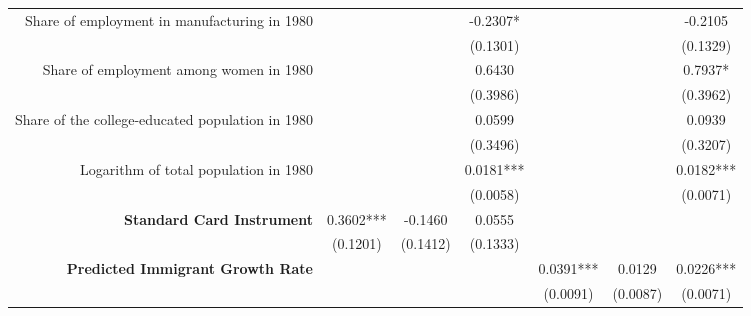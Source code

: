 \begin{frame}
\begin{table}[ht]
{\begin{tabular}{rcccccc}
                Share of employment in manufacturing in 1980                  &                 &                 & -0.2307*        &                &                 & -0.2105         \\
                                                                              &                 &                 & \small(0.1301)  &                &                 & \small(0.1329)  \\
                Share of employment among women in 1980                       &                 &                 & 0.6430          &                &                 & 0.7937*         \\
                                                                              &                 &                 & \small(0.3986)  &                &                 & \small(0.3962)  \\
                Share of the college-educated population in 1980              &                 &                 & 0.0599          &                &                 & 0.0939          \\
                                                                              &                 &                 & \small(0.3496)  &                &                 & \small(0.3207)  \\
                Logarithm of total population in 1980                         &                 &                 & 0.0181***       &                &                 & 0.0182***       \\
                                                                              &                 &                 & \small(0.0058)  &                &                 & \small(0.0071)  \\
                \bf{Standard Card Instrument}                                 & 0.3602***       & -0.1460         & 0.0555          &                &                 &                 \\
                                                                              & \small(0.1201)  & \small(0.1412)  & \small(0.1333)  &                &                 &                 \\
                \bf{Predicted Immigrant Growth Rate}                          &                 &                 &                 & 0.0391***      & 0.0129          & 0.0226***       \\
                                                                              &                 &                 &                 & \small(0.0091) & \small(0.0087)  & \small(0.0071)  \\

\end{tabular}}
\end{table}
\end{frame}
